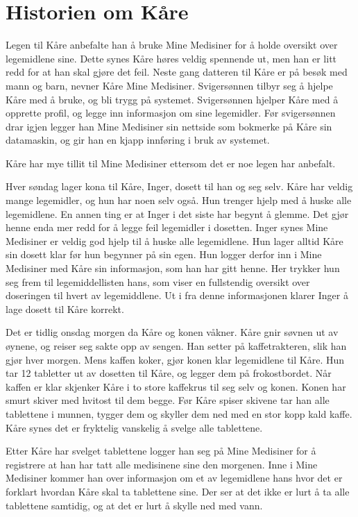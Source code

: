 \chapter{Historien om Kåre} \label{chap:kaareHistorie}

Legen til Kåre anbefalte han å bruke Mine Medisiner for å holde oversikt over legemidlene sine. Dette synes Kåre høres veldig spennende ut, men han er litt redd for at han skal gjøre det feil. Neste gang datteren til Kåre er på besøk med mann og barn, nevner Kåre Mine Medisiner. Svigersønnen tilbyr seg å hjelpe Kåre med å bruke, og bli trygg på systemet. Svigersønnen hjelper Kåre med å opprette profil, og legge inn informasjon om sine legemidler. Før svigersønnen drar igjen legger han Mine Medisiner sin nettside som bokmerke på Kåre sin datamaskin, og gir han en kjapp innføring i bruk av systemet. 

Kåre har mye tillit til Mine Medisiner ettersom det er noe legen har anbefalt. 

Hver søndag lager kona til Kåre, Inger, dosett til han og seg selv. Kåre har veldig mange legemidler, og hun har noen selv også. Hun trenger hjelp med å huske alle legemidlene. En annen ting er at Inger i det siste har begynt å glemme. Det gjør henne enda mer redd for å legge feil legemidler i dosetten. Inger synes Mine Medisiner er veldig god hjelp til å huske alle legemidlene. Hun lager alltid Kåre sin dosett klar før hun begynner på sin egen. Hun logger derfor inn i Mine Medisiner med Kåre sin informasjon, som han har gitt henne. Her trykker hun seg frem til legemiddellisten hans, som viser en fullstendig oversikt over doseringen til hvert av legemiddlene. Ut i fra denne informasjonen klarer Inger å lage dosett til Kåre korrekt. 

Det er tidlig onsdag morgen da Kåre og konen våkner. Kåre gnir søvnen ut av øynene, og reiser seg sakte opp av sengen. Han setter på kaffetrakteren, slik han gjør hver morgen. Mens kaffen koker, gjør konen klar legemidlene til Kåre. Hun tar 12 tabletter ut av dosetten til Kåre, og legger dem på frokostbordet. Når kaffen er klar skjenker Kåre i to store kaffekrus til seg selv og konen. Konen har smurt skiver med hvitost til dem begge. Før Kåre spiser skivene tar han alle tablettene i munnen, tygger dem og skyller dem ned med en stor kopp kald kaffe. Kåre synes det er fryktelig vanskelig å svelge alle tablettene. 

Etter Kåre har svelget tablettene logger han seg på Mine Medisiner for å registrere at han har tatt alle medisinene sine den morgenen. Inne i Mine Medisiner kommer han over informasjon om et av legemidlene hans hvor det er forklart hvordan Kåre skal ta tablettene sine. Der ser at det ikke er lurt å ta alle tablettene samtidig, og at det er lurt å skylle ned med vann. 

